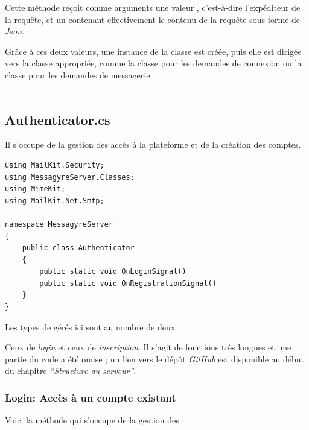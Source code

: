 \documentclass[12pt]{report}
\begin{document}
	Cette méthode reçoit comme arguments une valeur , c'est-à-dire l'expéditeur de la requête, et un  contenant effectivement le contenu de la requête sous forme de \textit{Json}.
	
	Grâce à ces deux valeurs, une instance de la classe  est créée, puis elle est dirigée vers la classe appropriée, comme la classe  pour les demandes de connexion ou la classe  pour les demandes de messagerie.
	\\\\
	\subsection{Authenticator.cs}
	
	Il s’occupe de la gestion des accès à la plateforme et de la création des comptes.
	
	\begin{verbatim}
using MailKit.Security;
using MessagyreServer.Classes;
using MimeKit;
using MailKit.Net.Smtp;

namespace MessagyreServer
{
	public class Authenticator
	{
		public static void OnLoginSignal()
		public static void OnRegistrationSignal()
	}
}
	\end{verbatim}
	
	Les types de  gérés ici sont au nombre de deux : 
	
	Ceux de \textit{login} et ceux de \textit{inscription}. Il s'agit de fonctions très longues et une partie du code a été omise ; un lien vers le dépôt \textit{GitHub} est disponible au début du chapitre \textit{“Structure du serveur”}.
	
	\subsubsection{Login: Accès à un compte existant}
	
	Voici la méthode qui s'occupe de la gestion des  :
	
\end{document}
